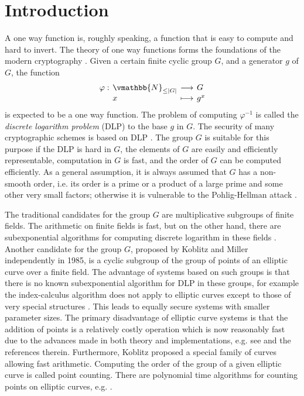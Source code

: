 
\chapter{Introduction}
\label{chapter:intro}

\lettrine[findent=-0.5em, loversize=0.1]{A}{} one way function is, roughly speaking, a function that 
is easy to compute and hard to invert. The theory of one way functions forms the foundations of the 
modern cryptography \cite{Levin2003, Katz2008}. Given a certain finite cyclic group $G$, and a 
generator $g$ of $G$, the function
$$
\setlength\arraycolsep{2pt}
\begin{array}{llll}
\varphi: & \vmathbb{N}_{\le \abs{G}} & \longrightarrow & G \\
 & x & \longmapsto & g^x
\end{array}
$$
is expected to be a one way function. The problem of computing $\varphi^{-1}$ is called the 
\emph{discrete logarithm problem} (DLP) to the base $g$ in $G$. The security of many cryptographic 
schemes is based on DLP \cite{KoblitzMen2004, Odlyzko2000}. The group $G$ is suitable for this 
purpose if the DLP is hard in $G$, the elements of $G$ are easily and efficiently representable, 
computation in $G$ is fast, and the order of $G$ can be computed efficiently. As a general 
assumption, it is always assumed that $G$ has a non-smooth order, i.e. its order is a prime or a 
product of a large prime and some other very small factors; otherwise it is vulnerable to the 
Pohlig-Hellman attack \cite{Pohlig1978}. 

The traditional candidates for the group $G$ are multiplicative subgroups of finite fields. The 
arithmetic on finite fields is fast, but on the other hand, there are subexponential algorithms for 
computing discrete logarithm in these fields \cite{MenOorVan96}. Another candidate for the group 
$G$, proposed by Koblitz \cite{Koblitz1987} and Miller \cite{Miller1985} independently in 1985, is a 
cyclic subgroup of the group of points of an elliptic curve over a finite field. The advantage of 
systems based on such groups is that there is no known subexponential algorithm for DLP in these 
groups, for example the index-calculus algorithm does not apply to elliptic curves except to those 
of very special structures \cite{SilvermanSuz1998, Miller1985}. This leads to equally secure systems 
with smaller parameter sizes. The primary disadvantage of elliptic curve systems is that the 
addition of points is a relatively costly operation which is now reasonably fast due to the advances 
made in both theory and implementations, e.g. see \cite{Hankerson2004} and the references therein. 
Furthermore, Koblitz \cite{Koblitz1991, KoblitzDS1998} proposed a special family of curves allowing 
fast arithmetic. Computing the order of the group of a given elliptic curve is called point 
counting. There are polynomial time algorithms for counting points on elliptic curves, e.g. 
\cite{Schoof1985}. 

